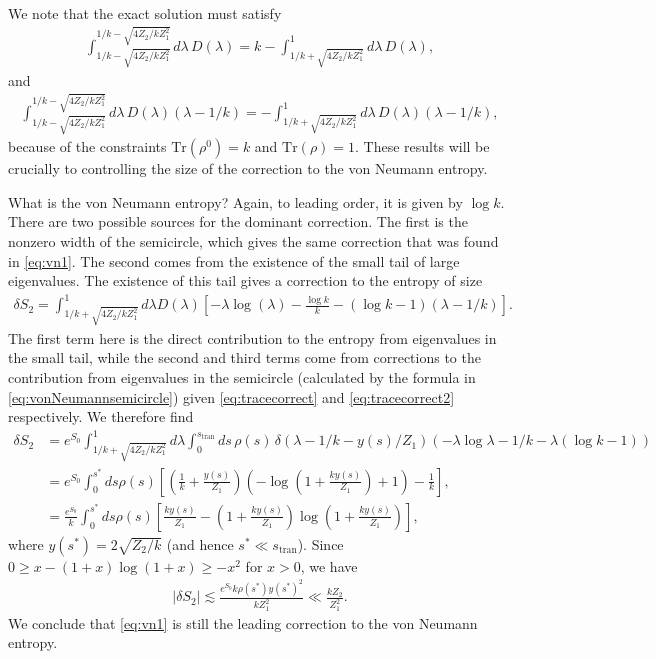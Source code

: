 \documentclass[12pt]{article}
\newcommand{\stran}{s_{\text{tran}}}
\numberwithin{equation}{section}
\def\tr{\text{Tr}}
\begin{document}
We note that the exact solution must satisfy
\begin{align} \label{eq:tracecorrect}
\int_{1/k - \sqrt{4Z_2 / k Z_1^2} }^{1/k - \sqrt{4Z_2 / k Z_1^2} } d \lambda\, D(\lambda) = k - \int_{1/k + \sqrt{4Z_2 / k Z_1^2} }^1 d \lambda\, D(\lambda),
\end{align}
and
\begin{align} \label{eq:tracecorrect2}
\int_{1/k - \sqrt{4Z_2 / k Z_1^2} }^{1/k - \sqrt{4Z_2 / k Z_1^2} } d \lambda\, D(\lambda) (\lambda - 1/k) = - \int_{1/k + \sqrt{4Z_2 / k Z_1^2} }^1 d \lambda\, D(\lambda) (\lambda - 1/k),
\end{align}
because of the constraints $\tr(\rho^0) = k$ and $\tr(\rho) = 1$. These results will be crucially to controlling the size of the correction to the von Neumann entropy.

What is the von Neumann entropy? Again, to leading order, it is given by $\log k$. There are two possible sources for the dominant correction. The first is the nonzero width of the semicircle, which gives the same correction that was found in \eqref{eq:vn1}. The second comes from the existence of the small tail of large eigenvalues. The existence of this tail gives a correction to the entropy of size
\begin{align}
\delta S_2 = \int_{1/k +\sqrt{4Z_2 / k Z_1^2}}^1 d \lambda D(\lambda) \left[-\lambda \log(\lambda) - \frac{\log k}{k} -(\log k - 1) (\lambda - 1/k)\right].
\end{align}
The first term here  is the direct contribution to the entropy from eigenvalues in the small tail, while the second and third terms come from corrections to the contribution from eigenvalues in the semicircle (calculated by the formula in \eqref{eq:vonNeumannsemicircle}) given \eqref{eq:tracecorrect} and \eqref{eq:tracecorrect2} respectively. We therefore find
\begin{align} \label{eq:thermalcorrection}
\delta S_2 &= e^{S_0}\int_{1/k +\sqrt{4Z_2 / k Z_1^2}}^1 d \lambda \int_0^{\stran} ds \,\rho(s)\, \delta( \lambda - 1/k - y(s)/ Z_1) (-\lambda\log \lambda - 1/k - \lambda (\log k - 1))
\\& = e^{S_0} \int_0^{s^*} ds \rho(s) \left[\left(\frac{1}{k} + \frac{y(s)}{Z_1}\right) \left(- \log \left(1 + \frac{k y(s)}{Z_1}\right) + 1\right) - \frac{1}{k}\right],
\\& = \frac{e^{S_0}}{k} \int_0^{s^*} ds \rho(s) \left[\frac{ky(s)}{Z_1} - \left(1 + \frac{ky(s)}{Z_1}\right) \log \left(1 + \frac{k y(s)}{Z_1}\right)\right],
\end{align}
where $y(s^*) = 2\sqrt{Z_2 / k}$ (and hence $s^* \ll \stran$). Since $0 \geq x - (1+x) \log(1 + x) \geq - x^2$ for $x > 0$, we have
\begin{align}
|\delta S_2| \lesssim \frac{e^{S_0} k \rho(s^*) y(s^*)^2}{k Z_1^2} \ll  \frac{k Z_2}{Z_1^2}.
\end{align}
We conclude that \eqref{eq:vn1} is still the leading correction to the von Neumann entropy.
\end{document}
